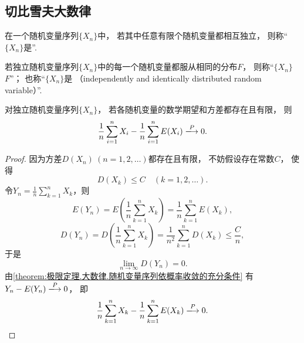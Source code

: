 \subsection{切比雪夫大数律}
\begin{definition}
在一个随机变量序列\(\{X_n\}\)中，
若其中任意有限个随机变量都相互独立，
则称“\(\{X_n\}\)是”.
\end{definition}

\begin{definition}
若独立随机变量序列\(\{X_n\}\)中的每一个随机变量都服从相同的分布\(F\)，
则称“\(\{X_n\}\)  \(F\)”；
也称“\(\{X_n\}\)是%
（independently and identically distributed random variable）”.
\end{definition}

\begin{theorem}[切比雪夫大数律]\label{theorem:极限定理.大数律.切比雪夫大数律}
对独立随机变量序列\(\{X_n\}\)，
若各随机变量的数学期望和方差都存在且有限，
则\[
	\frac{1}{n} \sum_{i=1}^n X_i
	- \frac{1}{n} \sum_{i=1}^n E(X_i)
	\toP 0.
\]
\begin{proof}
因为方差\(D(X_n)\ (n=1,2,\dotsc)\)都存在且有限，
不妨假设存在常数\(C\)，
使得\[
	D(X_k) \leq C
	\quad(k=1,2,\dotsc).
\]
\def\Yn{\frac{1}{n} \sum_{k=1}^n X_k}
令\(Y_n=\Yn\)，则\[
	E(Y_n)
	= E\left(\Yn\right)
	= \frac{1}{n} \sum_{k=1}^n E(X_k),
\]\[
	D(Y_n)
	= D\left(\Yn\right)
	= \frac{1}{n^2} \sum_{k=1}^n D(X_k) \leq \frac{C}{n},
\]
于是\[
	\lim_{n\to\infty} D(Y_n)
	= 0.
\]
由\cref{theorem:极限定理.大数律.随机变量序列依概率收敛的充分条件}
有\(Y_n - E(Y_n) \toP 0\)，
即\[
	\frac{1}{n} \sum_{k=1}^n X_k
	- \frac{1}{n} \sum_{k=1}^n E(X_k)
	\toP 0.
	\qedhere
\]
\end{proof}
\end{theorem}

